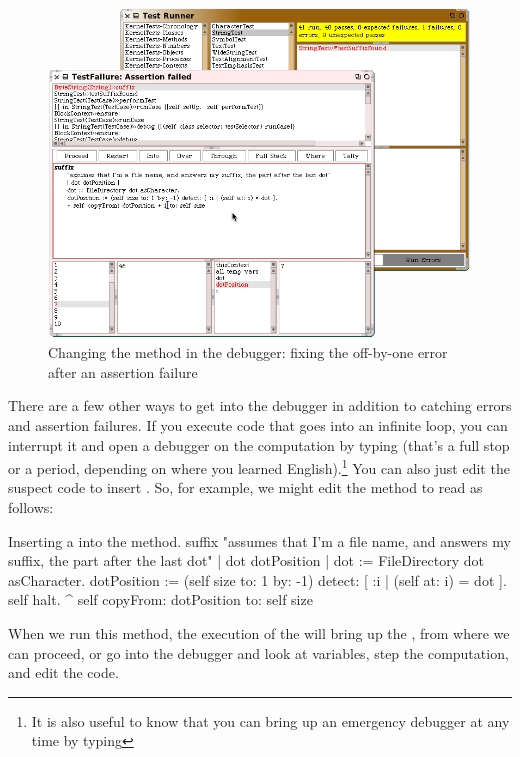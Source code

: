 \documentclass[a4paper,10pt,twoside]{book}
\begin{document}
\begin{figure}[btp]
	\begin{center}
		\includegraphics[width=\textwidth]{fixOffByOne}
	\end{center}
	\caption{Changing the  method in the debugger: fixing the off-by-one error after an \sunit assertion failure}
	\label{fig:fixOffByOne}
\end{figure}

There are a few other ways to get into the debugger in addition to catching errors and assertion failures.
If you execute code that goes into an infinite loop, you can interrupt it and open a debugger on the computation by typing  (that's a full stop or a period, depending  on where you learned English).\footnote{It is also useful to know that you can bring up an emergency debugger at any time by typing }
You can also just edit the suspect code to insert .
So, for example, we might edit the  method to read as follows:

\needspace{11ex}
\begin{method}[suffix]{Inserting a  into the  method.}
suffix
	"assumes that I'm a file name, and answers my suffix, the part after the last dot"
	| dot dotPosition |
	dot := FileDirectory dot asCharacter.
	dotPosition := (self size to: 1 by: -1) detect: [ :i | (self at: i) = dot ].
	self halt.
	^ self copyFrom: dotPosition to: self size 
\end{method}

When we run this method, the execution of the  will bring up the , from where we can proceed, or go into the debugger and look at variables, step the computation, and edit the code.
\end{document}

